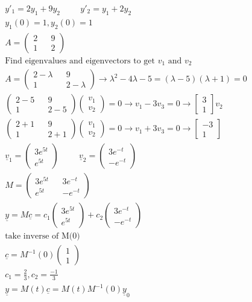 \documentclass[fleqn]{report}
\newcommand{\hp}{\hspace{1cm}}
\newcommand{\equations} [1] {
\begin{gather*}
#1
\end{gather*}
}
\newcommand{\twovec}[2]{ 
\begin{pmatrix}
#1 \\ 
#2
\end{pmatrix}
}
\begin{document}
\equations{
y'_1 = 2y_1 + 9y_2 \hp y'_2 = y_1 + 2y_2
\\
y_1(0) = 1, y_2(0) = 1
\\
A = \begin{pmatrix}
2 && 9 \\
1 && 2 
\end{pmatrix}
\\
\textrm{Find eigenvalues and eigenvectors to get $v_1$ and $v_2$}
\\
A = \begin{pmatrix}
2 - \lambda && 9 \\
1 && 2 - \lambda
\end{pmatrix}
\rightarrow
\lambda^2 - 4 \lambda - 5
=
(\lambda - 5)(\lambda + 1) = 0
\\
\begin{pmatrix}
2 - 5 && 9 \\
1 && 2 - 5
\end{pmatrix}
\begin{pmatrix}
v_1 \\ v_2 
\end{pmatrix}
=
0
\rightarrow
v_1 - 3v_3 = 0 
\rightarrow 
\begin{bmatrix}
3 \\ 1
\end{bmatrix}
v_2
\\
\begin{pmatrix}
2 + 1 && 9 \\
1 && 2 + 1
\end{pmatrix}
\begin{pmatrix}
v_1 \\ v_2 
\end{pmatrix}
=
0
\rightarrow
v_1 + 3v_3 = 0 
\rightarrow 
\begin{bmatrix}
-3 \\ 1
\end{bmatrix}
\\
\underline v_1 = \begin{pmatrix} 3e^{5t} \\ e^{5t} \end{pmatrix}
\hp
\underline v_2 = \begin{pmatrix} 3e^{-t} \\ -e^{-t} \end{pmatrix}
\\
M = \begin{pmatrix}
3e^{5t} && 3e^{-t} \\ 
e^{5t} && -e^{-t}
\end{pmatrix}
\\
\underline y = M \underline c = c_ 1 \begin{pmatrix} 3e^{5t} \\ e^{5t} \end{pmatrix}
 + c_2 \begin{pmatrix} 3e^{-t} \\ -e^{-t} \end{pmatrix}
 \\
 \textrm{take inverse of M(0)}
 \\
 \underline c = M^{-1} (0) \twovec{1}{1}
  \\
 c_1 = \frac{2}{3}, c_2 = \frac{-1}{3}
 \\
 \underline y = M(t) \underline c = M(t) M^{-1}(0) \underline y_0
}
\end{document}
